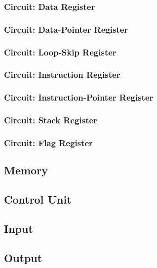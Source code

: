 \subsubsection{Circuit: Data Register}

\subsubsection{Circuit: Data-Pointer Register}

\subsubsection{Circuit: Loop-Skip Register}

\subsubsection{Circuit: Instruction Register}

\subsubsection{Circuit: Instruction-Pointer Register}

\subsubsection{Circuit: Stack Register}

\subsubsection{Circuit: Flag Register}



\subsection{Memory}
\subsection{Control Unit}
\subsection{Input}
\subsection{Output}

